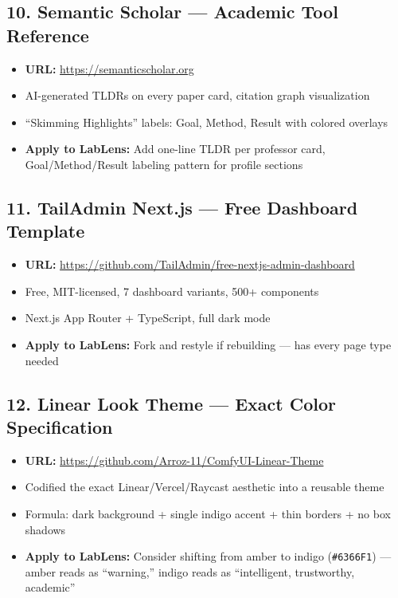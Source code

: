 \documentclass[11pt,letterpaper]{article}
\begin{document}
\subsection{10. Semantic Scholar --- Academic Tool Reference}
\begin{itemize}[nosep]
    \item \textbf{URL:} \url{https://semanticscholar.org}
    \item AI-generated TLDRs on every paper card, citation graph visualization
    \item ``Skimming Highlights'' labels: Goal, Method, Result with colored overlays
    \item \textbf{Apply to LabLens:} Add one-line TLDR per professor card, Goal/Method/Result labeling pattern for profile sections
\end{itemize}

\subsection{11. TailAdmin Next.js --- Free Dashboard Template}
\begin{itemize}[nosep]
    \item \textbf{URL:} \url{https://github.com/TailAdmin/free-nextjs-admin-dashboard}
    \item Free, MIT-licensed, 7 dashboard variants, 500+ components
    \item Next.js App Router + TypeScript, full dark mode
    \item \textbf{Apply to LabLens:} Fork and restyle if rebuilding --- has every page type needed
\end{itemize}

\subsection{12. Linear Look Theme --- Exact Color Specification}
\begin{itemize}[nosep]
    \item \textbf{URL:} \url{https://github.com/Arroz-11/ComfyUI-Linear-Theme}
    \item Codified the exact Linear/Vercel/Raycast aesthetic into a reusable theme
    \item Formula: dark background + single indigo accent + thin borders + no box shadows
    \item \textbf{Apply to LabLens:} Consider shifting from amber to indigo (\texttt{\#6366F1}) --- amber reads as ``warning,'' indigo reads as ``intelligent, trustworthy, academic''
\end{itemize}
\end{document}
